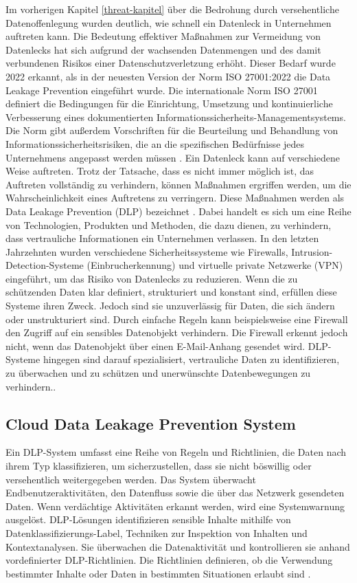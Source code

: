 Im vorherigen Kapitel \ref{threat-kapitel} über die Bedrohung durch versehentliche Datenoffenlegung wurden deutlich, wie schnell ein Datenleck in Unternehmen auftreten kann. Die Bedeutung effektiver Maßnahmen zur Vermeidung von Datenlecks hat sich aufgrund der wachsenden Datenmengen und des damit verbundenen Risikos einer Datenschutzverletzung erhöht. Dieser Bedarf wurde 2022 erkannt, als in der neuesten Version der Norm ISO 27001:2022 die Data Leakage Prevention eingeführt wurde. Die internationale Norm ISO 27001 definiert die Bedingungen für die Einrichtung, Umsetzung und kontinuierliche Verbesserung eines dokumentierten Informationssicherheits-Managementsystems. Die Norm gibt außerdem Vorschriften für die Beurteilung und Behandlung von Informationssicherheitsrisiken, die an die spezifischen Bedürfnisse jedes Unternehmens angepasst werden müssen \cite{Monev.2023}.
Ein Datenleck kann auf verschiedene Weise auftreten. Trotz der Tatsache, dass es nicht immer möglich ist, das Auftreten vollständig zu verhindern, können Maßnahmen ergriffen werden, um die Wahrscheinlichkeit eines Auftretens zu verringern. Diese Maßnahmen werden als Data Leakage Prevention (DLP) bezeichnet \cite{Monev.2023}. Dabei handelt es sich um eine Reihe von Technologien, Produkten und Methoden, die dazu dienen, zu verhindern, dass vertrauliche Informationen ein Unternehmen verlassen. In den letzten Jahrzehnten wurden verschiedene Sicherheitssysteme wie Firewalls, Intrusion-Detection-Systeme (Einbrucherkennung) und virtuelle private Netzwerke (VPN) eingeführt, um das Risiko von Datenlecks zu reduzieren. Wenn die zu schützenden Daten klar definiert, strukturiert und konstant sind, erfüllen diese Systeme ihren Zweck. Jedoch sind sie unzuverlässig für Daten, die sich ändern oder unstrukturiert sind. Durch einfache Regeln kann beispielsweise eine Firewall den Zugriff auf ein sensibles Datenobjekt verhindern. Die Firewall erkennt jedoch nicht, wenn das Datenobjekt über einen E-Mail-Anhang gesendet wird. DLP-Systeme hingegen sind darauf spezialisiert, vertrauliche Daten zu identifizieren, zu überwachen und zu schützen und unerwünschte Datenbewegungen zu verhindern.\cite{Alneyadi.2016}.

\subsection{Cloud Data Leakage Prevention System}
Ein DLP-System umfasst eine Reihe von Regeln und Richtlinien, die Daten nach ihrem Typ klassifizieren, um sicherzustellen, dass sie nicht böswillig oder versehentlich weitergegeben werden. Das System überwacht Endbenutzeraktivitäten, den Datenfluss sowie die über das Netzwerk gesendeten Daten. Wenn verdächtige Aktivitäten erkannt werden, wird eine Systemwarnung ausgelöst. DLP-Lösungen identifizieren sensible Inhalte mithilfe von Datenklassifizierungs-Label, Techniken zur Inspektion von Inhalten und Kontextanalysen. Sie überwachen die Datenaktivität und kontrollieren sie anhand vordefinierter DLP-Richtlinien. Die Richtlinien definieren, ob die Verwendung bestimmter Inhalte oder Daten in bestimmten Situationen erlaubt sind \cite{Chugh.2023}.

